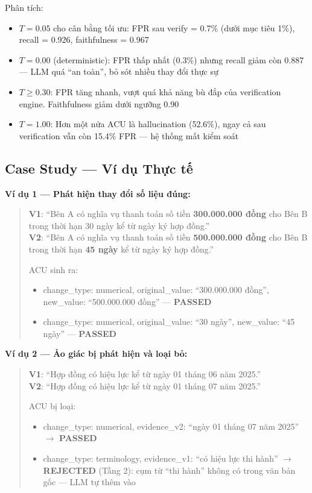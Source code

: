 Phân tích:
\begin{itemize}
    \item $T = 0.05$ cho cân bằng tối ưu: FPR sau verify = 0.7\% (dưới mục tiêu 1\%), recall = 0.926, faithfulness = 0.967
    \item $T = 0.00$ (deterministic): FPR thấp nhất (0.3\%) nhưng recall giảm còn 0.887 — LLM quá ``an toàn'', bỏ sót nhiều thay đổi thực sự
    \item $T \geq 0.30$: FPR tăng nhanh, vượt quá khả năng bù đắp của verification engine. Faithfulness giảm dưới ngưỡng 0.90
    \item $T = 1.00$: Hơn một nửa ACU là hallucination (52.6\%), ngay cả sau verification vẫn còn 15.4\% FPR — hệ thống mất kiểm soát
\end{itemize}

\subsection{Case Study — Ví dụ Thực tế}

\textbf{Ví dụ 1 — Phát hiện thay đổi số liệu đúng:}

\begin{quote}
\small
\textbf{V1}: ``Bên A có nghĩa vụ thanh toán số tiền \textbf{300.000.000 đồng} cho Bên B trong thời hạn 30 ngày kể từ ngày ký hợp đồng.''\\
\textbf{V2}: ``Bên A có nghĩa vụ thanh toán số tiền \textbf{500.000.000 đồng} cho Bên B trong thời hạn \textbf{45 ngày} kể từ ngày ký hợp đồng.''

ACU sinh ra:
\begin{itemize}
    \item change\_type: numerical, original\_value: ``300.000.000 đồng'', new\_value: ``500.000.000 đồng'' — \textbf{PASSED}
    \item change\_type: numerical, original\_value: ``30 ngày'', new\_value: ``45 ngày'' — \textbf{PASSED}
\end{itemize}
\end{quote}

\textbf{Ví dụ 2 — Ảo giác bị phát hiện và loại bỏ:}

\begin{quote}
\small
\textbf{V1}: ``Hợp đồng có hiệu lực kể từ ngày 01 tháng 06 năm 2025.''\\
\textbf{V2}: ``Hợp đồng có hiệu lực kể từ ngày 01 tháng 07 năm 2025.''

ACU bị loại:
\begin{itemize}
    \item change\_type: numerical, evidence\_v2: ``ngày 01 tháng 07 năm 2025'' $\rightarrow$ \textbf{PASSED}
    \item change\_type: terminology, evidence\_v1: ``có hiệu lực thi hành'' $\rightarrow$ \textbf{REJECTED} (Tầng 2): cụm từ ``thi hành'' không có trong văn bản gốc — LLM tự thêm vào
\end{itemize}
\end{quote}

